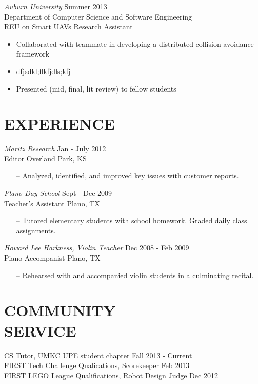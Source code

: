 \documentclass[line,margin]{res}
\begin{document}
\begin{resume}
		{\sl Auburn University}  \hfill  Summer 2013\\
		Department of Computer Science and Software Engineering  \\
		REU on Smart UAVs Research Assistant 
                 \begin{itemize}  \itemsep -2pt %
                 \item Collaborated with teammate in developing a distributed collision avoidance framework
		 \item dfjsdkl;flkfjdls;kfj
		 \item Presented (mid, final, lit review) to fellow students
                 \end{itemize} 
  
\section{EXPERIENCE} 
		
		{\it Maritz Research } \hfill            Jan - July 2012\\
		Editor 		\hfill Overland Park, KS
                 \begin{itemize}  \itemsep -2pt %
                 \item[--]  Analyzed, identified, and improved  key issues with customer reports.
                 \end{itemize} 
                {\it Plano Day School} \hfill        Sept - Dec  2009\\
        	Teacher's Assistant \hfill Plano, TX 
		\begin{itemize}
                   \item [--] Tutored elementary students with school homework. Graded daily class assignments. 
                   \end{itemize} 

              {\it Howard Lee Harkness, Violin Teacher} \hfill        Dec 2008 - Feb 2009\\
        	Piano Accompanist \hfill Plano, TX 
		\begin{itemize}
                   \item [--] Rehearsed with and accompanied violin students in a culminating recital. 
                   \end{itemize} 

\section{COMMUNITY \\ SERVICE}  
            	CS Tutor, UMKC UPE student chapter  \hfill Fall 2013 - Current \\
                FIRST Tech Challenge Qualications, Scorekeeper \hfill Feb 2013 \\
		FIRST LEGO League Qualifications, Robot Design Judge \hfill Dec 2012 
	

\end{resume}
\end{document}
